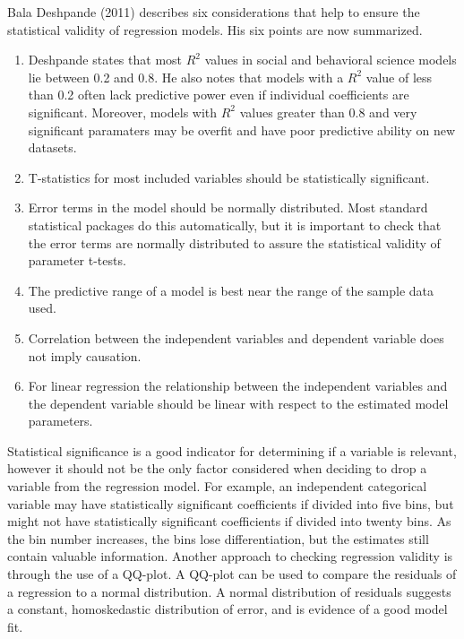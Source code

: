 \documentclass[preprint,12pt,times]{elsarticle}
\begin{document}
Bala Deshpande (2011) describes six considerations that help to ensure the statistical validity of regression models. His six points are now summarized.
\begin{enumerate}
  \item Deshpande states that most $R^2$ values in social and behavioral science models lie between 0.2 and 0.8.  He also notes that models with a $R^2$ value of less than 0.2 often lack predictive power even if individual coefficients are significant.  Moreover, models with $R^2$ values greater than 0.8 and very significant paramaters may be overfit and have poor predictive ability on new datasets.
  \item T-statistics for most included variables should be statistically significant.
  \item Error terms in the model should be normally distributed.  Most standard statistical packages do this automatically, but it is important to check that the error terms are normally distributed to assure the statistical validity of parameter t-tests.
  \item  The predictive range of a model is best near the range of the sample data used.
  \item Correlation between the independent variables and dependent variable does not imply causation.
  \item For linear regression the relationship between the independent variables and the dependent variable should be linear with respect to the estimated model parameters.
\end{enumerate}

Statistical significance is a good indicator for determining if a variable is relevant, however it should not be the only factor considered when deciding to drop a variable from the regression model.  For example, an independent categorical variable may have statistically significant coefficients if divided into five bins, but might not have statistically significant coefficients if divided into twenty bins. As the bin number increases, the bins lose differentiation, but the estimates still contain valuable information.  Another approach to checking regression validity is through the use of a QQ-plot.  A QQ-plot can be used to compare the residuals of a regression to a normal distribution.  A normal distribution of residuals suggests a constant, homoskedastic distribution of error, and is evidence of a good model fit.
    
\end{document}
